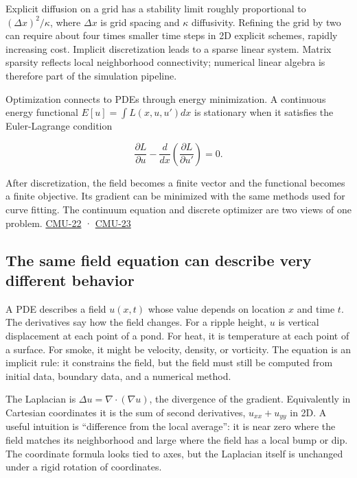 Explicit diffusion on a grid has a stability limit roughly proportional to \((\Delta x)^2/\kappa\), where \(\Delta x\) is grid spacing and \(\kappa\) diffusivity. Refining the grid by two can require about four times smaller time steps in 2D explicit schemes, rapidly increasing cost. Implicit discretization leads to a sparse linear system. Matrix sparsity reflects local neighborhood connectivity; numerical linear algebra is therefore part of the simulation pipeline.

Optimization connects to PDEs through energy minimization. A continuous energy functional \(E[u]=\int L(x,u,u')dx\) is stationary when it satisfies the Euler-Lagrange condition

\[
\frac{\partial L}{\partial u}-\frac{d}{dx}\left(\frac{\partial L}{\partial u'}\right)=0.
\]

After discretization, the field becomes a finite vector and the functional becomes a finite objective. Its gradient can be minimized with the same methods used for curve fitting. The continuum equation and discrete optimizer are two views of one problem. \hyperref[04-visual-computing-ii-ch036-cmu-22---optimization]{CMU-22} · \hyperref[04-visual-computing-ii-ch036-cmu-23---physically-based-animation-and-pdes]{CMU-23}

\subsection{The same field equation can describe very different behavior}\label{04-visual-computing-ii-ch030-the-same-field-equation-can-describe-very-different-behavior}

A PDE describes a field \(u(x,t)\) whose value depends on location \(x\) and time \(t\). The derivatives say how the field changes. For a ripple height, \(u\) is vertical displacement at each point of a pond. For heat, it is temperature at each point of a surface. For smoke, it might be velocity, density, or vorticity. The equation is an implicit rule: it constrains the field, but the field must still be computed from initial data, boundary data, and a numerical method.

The Laplacian is \(\Delta u=\nabla\cdot(\nabla u)\), the divergence of the gradient. Equivalently in Cartesian coordinates it is the sum of second derivatives, \(u_{xx}+u_{yy}\) in 2D. A useful intuition is ``difference from the local average'': it is near zero where the field matches its neighborhood and large where the field has a local bump or dip. The coordinate formula looks tied to axes, but the Laplacian itself is unchanged under a rigid rotation of coordinates.

